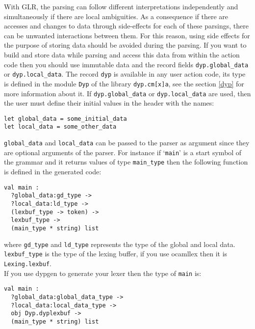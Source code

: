\documentclass[12pt]{article}
\begin{document}
{With GLR, the parsing can follow different interpretations independently and simultaneously if there are local ambiguities. As a consequence if there are accesses and changes to data
through side-effects for each of these parsings, there can be unwanted
interactions between them. For this reason, using side effects for the purpose of storing data should be avoided during the parsing. If you want to build and store data while parsing and access this data from within the action code then you should use immutable data and the record fields \verb|dyp.global_data| or \verb|dyp.local_data|. The record \verb|dyp| is available in any user action code, its type is defined in the module \verb|Dyp| of the library \verb|dyp.cm[x]a|, see the section \ref{dyp} for more information about it. If \verb|dyp.global_data| or \verb|dyp.local_data| are used, then the user must define their initial values in the header with the names:
\begin{verbatim}
let global_data = some_initial_data
let local_data = some_other_data
\end{verbatim}

\verb|global_data| and \verb|local_data| can be passed to the parser as argument since they are optional arguments of the parser. For instance if `\verb|main|' is a start symbol of the grammar and it returns values of type \verb|main_type| then the following function is defined in the generated code:
\begin{verbatim}
val main :
  ?global_data:gd_type ->
  ?local_data:ld_type ->
  (lexbuf_type -> token) ->
  lexbuf_type ->
  (main_type * string) list
\end{verbatim}
where \verb|gd_type| and \verb|ld_type| represents the type of the global and local data. \verb|lexbuf_type| is the type of the lexing buffer, if you use ocamllex then it is \verb|Lexing.lexbuf|.\\

If you use dypgen to generate your lexer then the type of \verb|main| is:
\begin{verbatim}
val main :
  ?global_data:global_data_type ->
  ?local_data:local_data_type ->
  obj Dyp.dyplexbuf ->
  (main_type * string) list
\end{verbatim}

}
\end{document}

